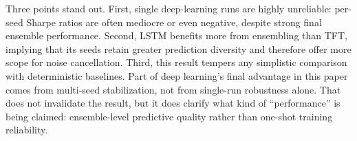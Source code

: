 Three points stand out.
First, single deep-learning runs are highly unreliable: per-seed Sharpe ratios
are often mediocre or even negative, despite strong final ensemble
performance.
Second, LSTM benefits more from ensembling than TFT, implying that its seeds
retain greater prediction diversity and therefore offer more scope for noise
cancellation.
Third, this result tempers any simplistic comparison with deterministic
baselines.
Part of deep learning's final advantage in this paper comes from
multi-seed stabilization, not from single-run robustness alone.
That does not invalidate the result, but it does clarify what kind of
“performance” is being claimed: ensemble-level predictive quality rather than
one-shot training reliability.
